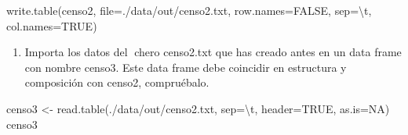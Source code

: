 \documentclass[
]{article}
\newenvironment{Shaded}{\begin{snugshade}}{\end{snugshade}}
\newcommand{\AttributeTok}[1]{\textcolor[rgb]{0.77,0.63,0.00}{#1}}
\newcommand{\ConstantTok}[1]{\textcolor[rgb]{0.00,0.00,0.00}{#1}}
\newcommand{\FunctionTok}[1]{\textcolor[rgb]{0.00,0.00,0.00}{#1}}
\newcommand{\NormalTok}[1]{#1}
\newcommand{\OtherTok}[1]{\textcolor[rgb]{0.56,0.35,0.01}{#1}}
\newcommand{\SpecialCharTok}[1]{\textcolor[rgb]{0.00,0.00,0.00}{#1}}
\newcommand{\StringTok}[1]{\textcolor[rgb]{0.31,0.60,0.02}{#1}}
\providecommand{\tightlist}{%
  \setlength{\itemsep}{0pt}\setlength{\parskip}{0pt}}
\begin{document}
\begin{Shaded}
\begin{Highlighting}[]
\FunctionTok{write.table}\NormalTok{(censo2, }\AttributeTok{file=}\StringTok{\textquotesingle{}./data/out/censo2.txt\textquotesingle{}}\NormalTok{, }\AttributeTok{row.names=}\ConstantTok{FALSE}\NormalTok{, }\AttributeTok{sep=}\StringTok{\textquotesingle{}}\SpecialCharTok{\textbackslash{}t}\StringTok{\textquotesingle{}}\NormalTok{, }\AttributeTok{col.names=}\ConstantTok{TRUE}\NormalTok{)}
\end{Highlighting}
\end{Shaded}

\begin{enumerate}
\def\labelenumi{\arabic{enumi}.}
\setcounter{enumi}{6}
\tightlist
\item
  Importa los datos del chero censo2.txt que has creado antes en un
  data frame con nombre censo3. Este data frame debe coincidir en
  estructura y composición con censo2, compruébalo.
\end{enumerate}

\begin{Shaded}
\begin{Highlighting}[]
\NormalTok{censo3 }\OtherTok{\textless{}{-}} \FunctionTok{read.table}\NormalTok{(}\StringTok{\textquotesingle{}./data/out/censo2.txt\textquotesingle{}}\NormalTok{, }\AttributeTok{sep=}\StringTok{\textquotesingle{}}\SpecialCharTok{\textbackslash{}t}\StringTok{\textquotesingle{}}\NormalTok{, }\AttributeTok{header=}\ConstantTok{TRUE}\NormalTok{, }\AttributeTok{as.is=}\ConstantTok{NA}\NormalTok{)}
\NormalTok{censo3}
\end{Highlighting}
\end{Shaded}
\end{document}
